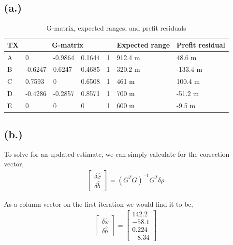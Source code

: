 \documentclass[11pt]{article}
\begin{document}
\subsection*{(a.)}
\begin{table}[h!]
\centering
\renewcommand{\arraystretch}{2}
\begin{tabular}{|p{1cm}|p{2cm}|p{2cm}|p{2cm}|p{2cm}|p{3cm}|p{3cm}|}
\hline
TX & \multicolumn{4}{c|}{G-matrix} & Expected range & Prefit residual \\ \hline

A & 0& -0.9864& 0.1644& 1& 912.4 m& 48.6 m\\ \hline

B & -0.6247& 0.6247& 0.4685& 1& 320.2 m& -133.4 m\\ \hline

C & 0.7593& 0& 0.6508& 1& 461 m& 100.4 m\\ \hline

D & -0.4286& -0.2857& 0.8571& 1& 700 m& -51.2 m\\ \hline

E & 0& 0& 0& 1& 600 m& -9.5 m\\ \hline

\end{tabular}
\caption{G-matrix, expected ranges, and prefit residuals}
\label{tab:Gmatrix}
\end{table}

\subsection*{(b.)}
\hspace*{2em}To solve for an updated estimate, we can simply calculate for the correction vector,
\begin{gather*}
\begin{bmatrix}
\delta\hat{x} \\
\delta\hat{b}
\end{bmatrix} = (G^T G)^{-1} G^T \delta \rho
\end{gather*}

\hspace*{2em}As a column vector on the first iteration we would find it to be,
\begin{gather*}
\begin{bmatrix}
\delta\hat{x} \\
\delta\hat{b}
\end{bmatrix} = 
\begin{bmatrix}
142.2 \\
-58.1 \\
0.224 \\
-8.34
\end{bmatrix}
\end{gather*}
\end{document}
